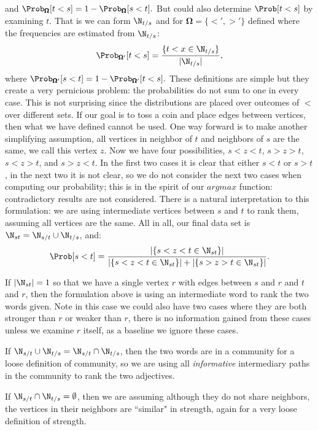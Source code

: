 and $\Prob_{\pmb{\Omega}}[t < s] = 1 - \Prob_{\pmb{\Omega}}[s < t].$ But could also determine $\Prob[t < s]$ by examining $t$. That is we can form $\N_{t/s}$ and for $\pmb{\Omega} = \{<',>'\}$ defined where the frequencies are estimated from $\N_{t/s}$:
	\[
		\Prob_{\pmb{\Omega}'}[t < s] = \frac{\{ t < x \in \N_{t/s}\}}{|\N_{t/s}|},
	\]
where $\Prob_{\pmb{\Omega}'}[s < t] = 1 - \Prob_{\pmb{\Omega}'}[t < s].$ These definitions are simple but they create a very pernicious problem: the probabilities do not sum to one in every case. This is not surprising since the distributions are placed over outcomes of $<$ over different sets. If our goal is to toss a coin and place edges between vertices, then what we have defined cannot be used. One way forward is to make another simplifying assumption, all vertices in neighbor of $t$ and neighbors of $s$ are the same, we call this vertex $z$. Now we have four possibilities, $s < z < t$, $s > z > t$, $s < z > t$, and $s > z < t$. In the first two cases it is clear that either $s < t$ or $s > t$, in the next two it is not clear, so we do not consider the next two cases when computing our probability; this is in the spirit of our $argmax$ function: contradictory results are not considered. There is a natural interpretation to this formulation: we are using intermediate vertices between $s$ and $t$ to rank them, assuming all vertices are the same. All in all, our final data set is $\N_{st} = \N_{s/t} \cup \N_{t/s}$, and: 
	\[
		\Prob[s < t ] = \frac{| \{s < z < t \in \N_{st}\}|}{|\{s < z < t \in \N_{st}\}| + |\{s > z > t \in \N_{st}\}|}.
	\]

\begin{remark}
If $| \N_{st} | = 1$ so that we have a single vertex $r$ with edges between $s$ and $r$ and $t$ and $r$, then the formulation above is using an intermediate word to rank the two words given. Note in this case we could also have two cases where they are both stronger than $r$ or weaker than $r$, there is no information gained from these cases unless we examine $r$ itself, as a baseline we ignore these cases.
\end{remark}

\begin{remark}
If $\N_{s/t} \cup \N_{t/s} = \N_{s/t} \cap \N_{t/s}$, then the two words are in a community for a loose definition of community, so we are using all \textit{informative} intermediary paths in the community to rank the two adjectives.
\end{remark}

\begin{remark}
If $\N_{s/t} \cap \N_{t/s} = \emptyset$, then we are assuming although they do not share neighbors, the vertices in their neighbors are ``similar" in strength, again for a very loose definition of strength. 
\end{remark}

